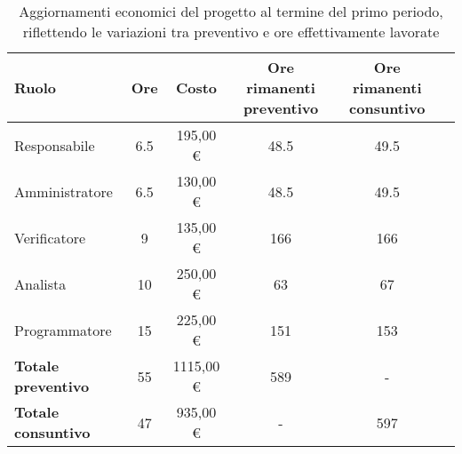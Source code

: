 \newpage
{}
\begin{table}[!h]
    \centering
    \begin{tabular}{|l| c| c| c| c| c| } 
        \hline
        \textbf{Ruolo} & \textbf{Ore} & \textbf{Costo} & \textbf{Ore rimanenti preventivo} & \textbf{Ore rimanenti consuntivo} \\
        \hline  
        Responsabile               &  6.5 &  195,00 € &  48.5 &  49.5 \\ 
        Amministratore             &  6.5 &  130,00 € &  48.5 &  49.5 \\ 
        Verificatore               &  9   &  135,00 € & 166   & 166   \\ 
        Analista                   & 10   &  250,00 € &  63   &  67   \\ 
        Programmatore              & 15   &  225,00 € & 151   & 153   \\ 
        \hline
        \textbf{Totale preventivo} & 55   & 1115,00 € & 589   &   -   \\
        \hline
        \textbf{Totale consuntivo} & 47   &  935,00 € &   -   & 597   \\
        \hline
    \end{tabular}
    \caption{Aggiornamenti economici del progetto al termine del primo periodo, riflettendo le variazioni tra preventivo e ore effettivamente lavorate}
    \label{tab:3}
\end{table}

